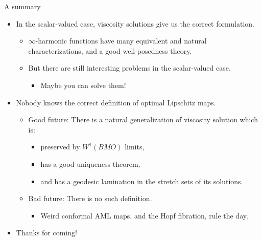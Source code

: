 \documentclass[10pt]{beamer}
\begin{document}
\begin{frame}{A summary}
\begin{itemize}
\item In the scalar-valued case, viscosity solutions give us the correct formulation.
\begin{itemize}
\item $\infty$-harmonic functions have many equivalent and natural characterizations, and a good well-posedness theory.
\item But there are still interesting problems in the scalar-valued case.
\begin{itemize}
\item Maybe you can solve them! \pause
\end{itemize}
\end{itemize}
\item Nobody knows the correct definition of optimal Lipschitz maps.
\begin{itemize}
    \item Good future: There is a natural generalization of viscosity solution which is:
    \begin{itemize}
    \item preserved by $W^1(BMO)$ limits,
    \item has a good uniqueness theorem,
    \item and has a geodesic lamination in the stretch sets of its solutions.
    \end{itemize}
    \item Bad future: There is no such definition.
    \begin{itemize}
    \item Weird conformal AML maps, and the Hopf fibration, rule the day. \pause
    \end{itemize}
\end{itemize}
\item Thanks for coming!
\end{itemize}
\end{frame}
\end{document}
